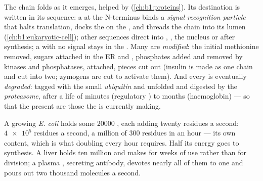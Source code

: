 \begin{proposition}\label{prop:b1:gene-expression:after}
The chain folds as it emerges, helped by 
(\cref{ch:b1:proteins}). Its destination is written in its sequence:
a \emph{} at the N-terminus binds a \emph{signal
recognition particle} that halts translation, docks the  on
the , and threads the chain into its lumen
(\cref{ch:b1:eukaryotic-cell}); other sequences direct  into
, , the nucleus or  after
synthesis; a  with no signal stays in the . Many
 are \emph{modified}: the initial methionine removed, sugars
attached in the ER and , phosphates added and removed by kinases
and phosphatases,  attached, pieces cut out (insulin is made as
one chain and cut into two; zymogens are cut to activate them). And
every  is eventually \emph{degraded}: tagged with the small
 \emph{ubiquitin} and unfolded and digested by the
\emph{proteasome}, after a life of minutes (regulatory ) to
months (haemoglobin) --- so that the  present are those the
 is currently making.
\end{proposition}

\begin{example}\label{ex:b1:gene-expression:numbers}
A growing \emph{E. coli} holds some \num{20000} , each
adding twenty residues a second: $\num{4e5}$ residues a second, a
million  of \qty{300}{} residues in an hour --- its own
content, which is what doubling every hour requires. Half its
energy goes to  synthesis. A liver  holds ten million
 and makes  for weeks of use rather than for
division; a plasma , secreting antibody, devotes nearly all of
them to one  and pours out two thousand molecules a second.
\end{example}

